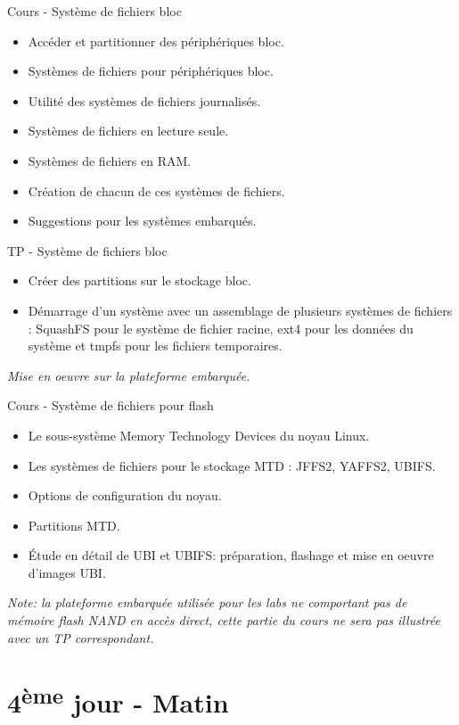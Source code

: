 \documentclass[a4paper,12pt,obeyspaces,spaces,hyphens]{article}
\begin{document}
\feagendatwocolumn
{Cours - Système de fichiers bloc}
{
  \begin{itemize}
  \item Accéder et partitionner des périphériques bloc.
  \item Systèmes de fichiers pour périphériques bloc.
  \item Utilité des systèmes de fichiers journalisés.
  \item Systèmes de fichiers en lecture seule.
  \item Systèmes de fichiers en RAM.
  \item Création de chacun de ces systèmes de fichiers.
  \item Suggestions pour les systèmes embarqués.
  \end{itemize}
}
{TP - Système de fichiers bloc}
{
  \begin{itemize}
  \item Créer des partitions sur le stockage bloc.
  \item Démarrage d'un système avec un assemblage de plusieurs systèmes
    de fichiers : SquashFS pour le système de fichier racine, ext4 pour
    les données du système et tmpfs pour les fichiers temporaires.
  \end{itemize}
  \vspace{0.5cm}
  {\em Mise en oeuvre sur la plateforme embarquée.}
}

\feagendaonecolumn
{Cours - Système de fichiers pour flash}
{
  \begin{itemize}
  \item Le sous-système Memory Technology Devices du noyau Linux.
  \item Les systèmes de fichiers pour le stockage MTD : JFFS2, YAFFS2,
    UBIFS.
  \item Options de configuration du noyau.
  \item Partitions MTD.
  \item Étude en détail de UBI et UBIFS: préparation, flashage et mise
    en oeuvre d'images UBI.
  \end{itemize}

  \vspace{0.5cm}

  {\em Note: la plateforme embarquée utilisée pour les labs ne
    comportant pas de mémoire flash NAND en accès direct, cette partie
    du cours ne sera pas illustrée avec un TP correspondant.}
}

\section{4\textsuperscript{ème} jour - Matin}
\end{document}
